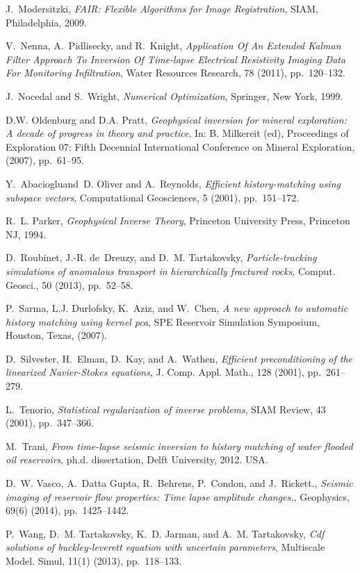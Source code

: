 \documentclass[english]{siamltex}
\begin{document}
\begin{thebibliography}{10}
{\sc J.~Modersitzki}, {\em {FAIR}: Flexible Algorithms for Image Registration},
  SIAM, Philadelphia, 2009.

{\sc V.~Nenna, A.~Pidlisecky, and R.~Knight}, {\em {Application Of An Extended
  Kalman Filter Approach To Inversion Of Time-lapse Electrical Resistivity
  Imaging Data For Monitoring Infiltration}}, Water Resources Research, 78
  (2011), pp.~120--132.

{\sc J.~Nocedal and S.~Wright}, {\em Numerical Optimization}, Springer, New
  York, 1999.

{\sc D.W. Oldenburg and D.A. Pratt}, {\em Geophysical inversion for mineral
  exploration: A decade of progress in theory and practice}, In: B. Milkereit
  (ed), Proceedings of Exploration 07: Fifth Decennial International Conference
  on Mineral Exploration,  (2007), pp.~61--95.

{\sc Y.~Abaciogluand~D. Oliver and A.~Reynolds}, {\em Efficient
  history-matching using subspace vectors}, Computational Geosciences, 5
  (2001), pp.~151--172.

{\sc R.~L. Parker}, {\em Geophysical Inverse Theory}, Princeton University
  Press, Princeton NJ, 1994.

{\sc D.~Roubinet, J.-R. de~Dreuzy, and D.~M. Tartakovsky}, {\em
  Particle-tracking simulations of anomalous transport in hierarchically
  fractured rocks}, Comput. Geosci., 50 (2013), pp.~52--58.

{\sc P.~Sarma, L.J. Durlofsky, K.~Aziz, and W.~Chen}, {\em A new approach to
  automatic history matching using kernel pca}, SPE Reservoir Simulation
  Symposium, Houston, Texas,  (2007).

{\sc D.~Silvester, H.~Elman, D.~Kay, and A.~Wathen}, {\em Efficient
  preconditioning of the linearized {N}avier-{S}tokes equations}, J. Comp.
  Appl. Math., 128 (2001), pp.~261--279.

{\sc L.~Tenorio}, {\em Statistical regularization of inverse problems}, {SIAM
  R}eview, 43 (2001), pp.~347--366.

{\sc M.~Trani}, {\em From time-lapse seismic inversion to history matching of
  water flooded oil reservoirs}, ph.d. dissertation, Delft University, 2012.
\newblock USA.

{\sc D.~W. Vasco, A.~Datta Gupta, R.~Behrens, P.~Condon, and J.~Rickett.}, {\em
  Seismic imaging of reservoir flow properties: Time lapse amplitude changes.},
  Geophysics, 69(6) (2014), pp.~1425--1442.

{\sc P.~Wang, D.~M. Tartakovsky, K.~D. Jarman, and A.~M. Tartakovsky}, {\em Cdf
  solutions of buckley-leverett equation with uncertain parameters}, Multiscale
  Model. Simul, 11(1) (2013), pp.~118--133.

\end{thebibliography}
\end{document}
